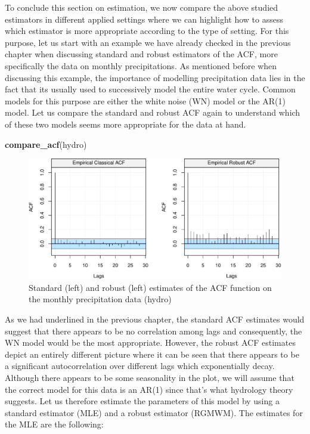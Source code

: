 \documentclass[]{book}
\newenvironment{Shaded}{\begin{snugshade}}{\end{snugshade}}
\newcommand{\KeywordTok}[1]{\textcolor[rgb]{0.13,0.29,0.53}{\textbf{#1}}}
\newcommand{\NormalTok}[1]{#1}
\theoremstyle{definition}
\theoremstyle{definition}
\theoremstyle{definition}
\theoremstyle{remark}
\begin{document}
To conclude this section on estimation, we now compare the above studied
estimators in different applied settings where we can highlight how to
assess which estimator is more appropriate according to the type of
setting. For this purpose, let us start with an example we have already
checked in the previous chapter when discussing standard and robust
estimators of the ACF, more specifically the data on monthly
precipitations. As mentioned before when discussing this example, the
importance of modelling precipitation data lies in the fact that its
usually used to successively model the entire water cycle. Common models
for this purpose are either the white noise (WN) model or the AR(1)
model. Let us compare the standard and robust ACF again to understand
which of these two models seems more appropriate for the data at hand.

\begin{Shaded}
\begin{Highlighting}[]
\KeywordTok{compare_acf}\NormalTok{(hydro)}
\end{Highlighting}
\end{Shaded}

\begin{figure}

{\centering \includegraphics{ts_files/figure-latex/unnamed-chunk-31-1} 

}

\caption{Standard (left) and robust (left) estimates of the ACF function on the monthly precipitation data (hydro)}\label{fig:unnamed-chunk-31}
\end{figure}

As we had underlined in the previous chapter, the standard ACF estimates
would suggest that there appears to be no correlation among lags and
consequently, the WN model would be the most appropriate. However, the
robust ACF estimates depict an entirely different picture where it can
be seen that there appears to be a significant autocorrelation over
different lags which exponentially decay. Although there appears to be
some seasonality in the plot, we will assume that the correct model for
this data is an AR(1) since that's what hydrology theory suggests. Let
us therefore estimate the parameters of this model by using a standard
estimator (MLE) and a robust estimator (RGMWM). The estimates for the
MLE are the following:
\end{document}
